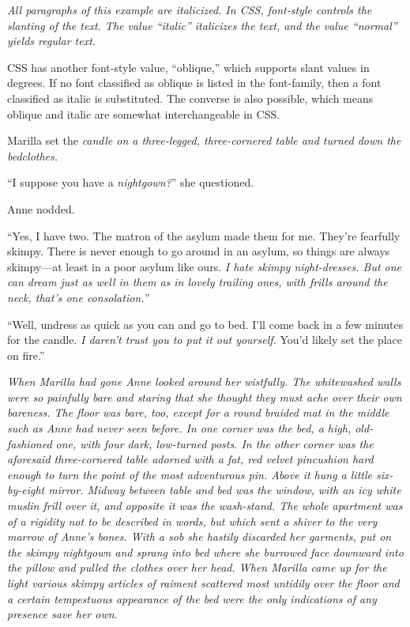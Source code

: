 \documentclass[a4paper]{article}
\begin{document}
{\itshape All paragraphs of this example are italicized. In CSS, font-style controls the slanting of the text. The value ``italic'' italicizes the text, and the value ``normal'' yields regular text.

CSS has another font-style value, ``oblique,'' which supports slant values in degrees. If no font classified as oblique is listed in the font-family, then a font classified as italic is substituted. The converse is also possible, which means oblique and italic are somewhat interchangeable in CSS.}


Marilla set the \itshape candle \upshape on a three-legged, three-cornered table and turned down the bedclothes.

``I suppose you have a {\itshape nightgown?}'' she questioned.

Anne nodded.

``Yes, I have two. The matron of the asylum made them for me. They're fearfully skimpy. There is never enough to go around in an asylum, so things are always skimpy---at least in a poor asylum like ours. \itshape I hate skimpy night-dresses. \upshape But one can dream just as well in them as in lovely trailing ones, with frills around the neck, that's one consolation.''

``Well, undress as quick as you can and go to bed. I'll come back in a few minutes for the candle. {\itshape I daren't trust you to put it out yourself.} You'd likely set the place on fire.''

\itshape When Marilla had gone Anne looked around her wistfully. The whitewashed walls were so painfully bare and staring that she thought they must ache over their own bareness. The floor was bare, too, except for a round braided mat in the middle such as Anne had never seen before. In one corner was the bed, a high, old-fashioned one, with four dark, low-turned posts. In the other corner was the aforesaid three-cornered table adorned with a fat, red velvet pincushion hard enough to turn the point of the most adventurous pin. Above it hung a little six-by-eight mirror. Midway between table and bed was the window, with an icy white muslin frill over it, and opposite it was the wash-stand. The whole apartment was of a rigidity not to be described in words, but which sent a shiver to the very marrow of Anne's bones. With a sob she hastily discarded her garments, put on the skimpy nightgown and sprang into bed where she burrowed face downward into the pillow and pulled the clothes over her head. When Marilla came up for the light various skimpy articles of raiment scattered most untidily over the floor and a certain tempestuous appearance of the bed were the only indications of any presence save her own. \upshape
\end{document}
